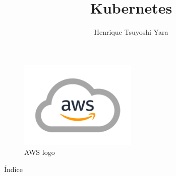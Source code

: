 \documentclass{beamer}
\title {Kubernetes}
\author {Henrique Tsuyoshi Yara}
\institute {OPUS-software}
\begin{document}
\begin{frame}{\titlepage}
	\begin{figure}[htpb]
		\centering
		\includegraphics[width=0.5\textwidth]{aws-logo}
		\caption{AWS logo}
	\end{figure}
\end{frame}

\begin{frame}{Índice}
\begin{multicols}{2}
  \tableofcontents
\end{multicols}
\end{frame}






\end{document}
